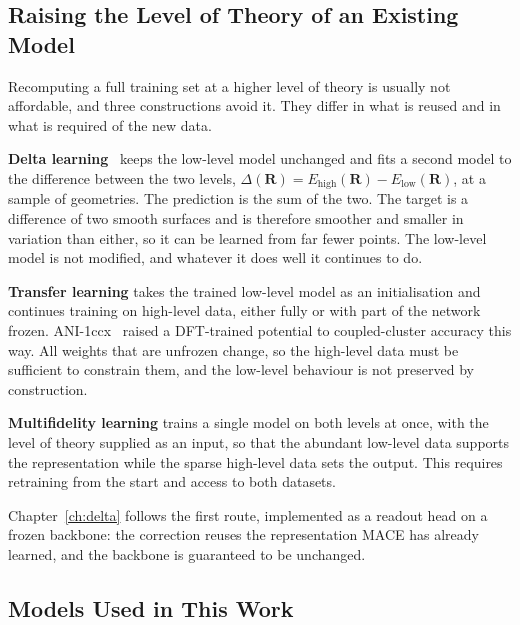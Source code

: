 \subsection{Raising the Level of Theory of an Existing Model}
\label{sec:mlip-fidelity}
 
Recomputing a full training set at a higher level of theory is usually not affordable,
and three constructions avoid it. They differ in what is reused and in what is required
of the new data.
 
\textbf{Delta learning}~\cite{ramakrishnan2015} keeps the low-level model unchanged and
fits a second model to the difference between the two levels,
$\Delta(\mathbf{R}) = E_{\text{high}}(\mathbf{R}) - E_{\text{low}}(\mathbf{R})$, at a
sample of geometries. The prediction is the sum of the two. The target is a difference
of two smooth surfaces and is therefore smoother and smaller in variation than either,
so it can be learned from far fewer points. The low-level model is not modified, and
whatever it does well it continues to do.
 
\textbf{Transfer learning} takes the trained low-level model as an initialisation and
continues training on high-level data, either fully or with part of the network frozen.
ANI-1ccx~\cite{smith2019ani1ccx} raised a DFT-trained potential to coupled-cluster
accuracy this way. All weights that are unfrozen change, so the high-level data must be
sufficient to constrain them, and the low-level behaviour is not preserved by
construction.
 
\textbf{Multifidelity learning} trains a single model on both levels at once, with the
level of theory supplied as an input, so that the abundant low-level data supports the
representation while the sparse high-level data sets the output. This requires
retraining from the start and access to both datasets.
 
Chapter~\ref{ch:delta} follows the first route, implemented as a readout head on a frozen
backbone: the correction reuses the representation MACE has already learned, and the
backbone is guaranteed to be unchanged.
 
\subsection{Models Used in This Work}
\label{sec:mlip-models}
 
